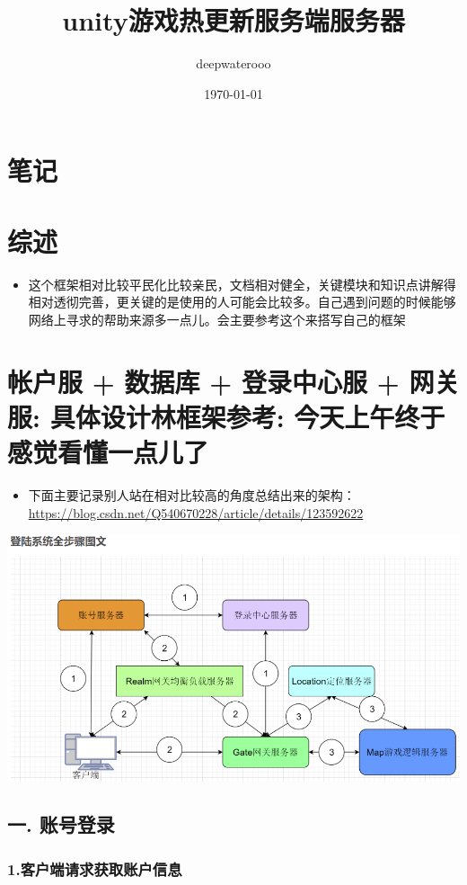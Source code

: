 \documentclass[9pt, b5paper]{article}
\author{deepwaterooo}
\date{\today}
\title{unity游戏热更新服务端服务器}
\begin{document}
\maketitle
\tableofcontents


\section{笔记}
\label{sec-1}
\section{综述}
\label{sec-2}
\begin{itemize}
\item 这个框架相对比较平民化比较亲民，文档相对健全，关键模块和知识点讲解得相对透彻完善，更关键的是使用的人可能会比较多。自己遇到问题的时候能够网络上寻求的帮助来源多一点儿。会主要参考这个来搭写自己的框架
\end{itemize}

\section{帐户服 + 数据库 + 登录中心服 + 网关服: 具体设计林框架参考: 今天上午终于感觉看懂一点儿了}
\label{sec-3}
\begin{itemize}
\item 下面主要记录别人站在相对比较高的角度总结出来的架构：\url{https://blog.csdn.net/Q540670228/article/details/123592622}
\end{itemize}

\includegraphics[width=.9\linewidth]{./pic/readme_20230124_102951.png}
\subsection{一. 账号登录}
\label{sec-3-1}
\subsubsection{1.客户端请求获取账户信息}
\label{sec-3-1-1}
\end{document}
